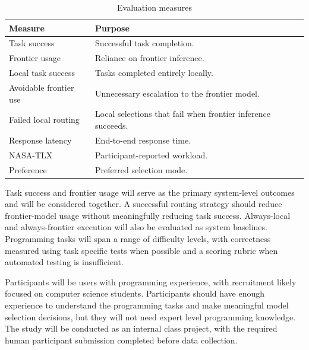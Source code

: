 \documentclass[sigconf,nonacm]{acmart}
\begin{document}
\begin{table}[htbp]
\centering
\caption{Evaluation measures}
\label{tab:evaluation}
\small
\begin{tabularx}{\columnwidth}{@{}p{}X@{}}
\toprule
\textbf{Measure} & \textbf{Purpose} \\
\midrule
Task success &
Successful task completion. \\

Frontier usage &
Reliance on frontier inference. \\

Local task success &
Tasks completed entirely locally. \\

Avoidable frontier use &
Unnecessary escalation to the frontier model. \\

Failed local routing &
Local selections that fail when frontier inference succeeds. \\

Response latency &
End-to-end response time. \\

NASA-TLX &
Participant-reported workload. \\

Preference &
Preferred selection mode. \\
\bottomrule
\end{tabularx}
\end{table}

\noindent
\begin{minipage}{\columnwidth}
Task success and frontier usage will serve as the primary system-level
outcomes and will be considered together. A successful routing strategy should
reduce frontier-model usage without meaningfully reducing task success.
Always-local and always-frontier execution will also be evaluated as system
baselines. Programming tasks will span a range of difficulty levels, with
correctness measured using task specific tests when possible and a scoring
rubric when automated testing is insufficient.\end{minipage}

Participants will be users with programming experience, with recruitment likely focused on computer science students. Participants should have enough experience to understand the programming tasks and make meaningful model selection decisions, but they will not need expert level programming knowledge. The study will be conducted as an internal class project, with the required human participant submission completed before data collection.
\end{document}
